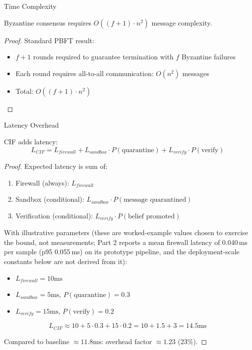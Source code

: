 \documentclass[
  ignorenonframetext,
]{beamer}
\begin{document}
\begin{frame}[allowframebreaks]{Time Complexity}
\begin{theorem}
\label{thm:consensus-complexity}
Byzantine consensus requires $O((f+1) \cdot n^2)$ message complexity.
\end{theorem}

\begin{proof}
Standard PBFT result:
\begin{itemize}
\item $f+1$ rounds required to guarantee termination with $f$ Byzantine failures
\item Each round requires all-to-all communication: $O(n^2)$ messages
\item Total: $O((f+1) \cdot n^2)$
\end{itemize}
\end{proof}
\end{frame}

\begin{frame}[allowframebreaks]{Latency Overhead}
\protect{}\label{sec:latency-overhead}
\begin{theorem}
\label{thm:latency-overhead}
CIF adds latency:
\begin{equation}
\label{eq:latency-formula}
L_{CIF} = L_{firewall} + L_{sandbox} \cdot P(\text{quarantine}) + L_{verify} \cdot P(\text{verify})
\end{equation}
\end{theorem}

\begin{proof}
Expected latency is sum of:
\begin{enumerate}
\item Firewall (always): $L_{firewall}$
\item Sandbox (conditional): $L_{sandbox} \cdot P(\text{message quarantined})$
\item Verification (conditional): $L_{verify} \cdot P(\text{belief promoted})$
\end{enumerate}

With illustrative parameters (these are worked-example values chosen to exercise the bound, not measurements; Part 2 reports a mean firewall latency of 0.040\,ms per sample (p95 0.055\,ms) on its prototype pipeline, and the deployment-scale constants below are not derived from it):
\begin{itemize}
\item $L_{firewall} = 10\text{ms}$
\item $L_{sandbox} = 5\text{ms}$, $P(\text{quarantine}) = 0.3$
\item $L_{verify} = 15\text{ms}$, $P(\text{verify}) = 0.2$
\end{itemize}

\begin{equation}
\label{eq:latency-empirical}
L_{CIF} \approx 10 + 5 \cdot 0.3 + 15 \cdot 0.2 = 10 + 1.5 + 3 = 14.5\text{ms}
\end{equation}

Compared to baseline $\approx 11.8\text{ms}$: overhead factor $\approx 1.23$ (23\%).
\end{proof}
\end{frame}
\end{document}

